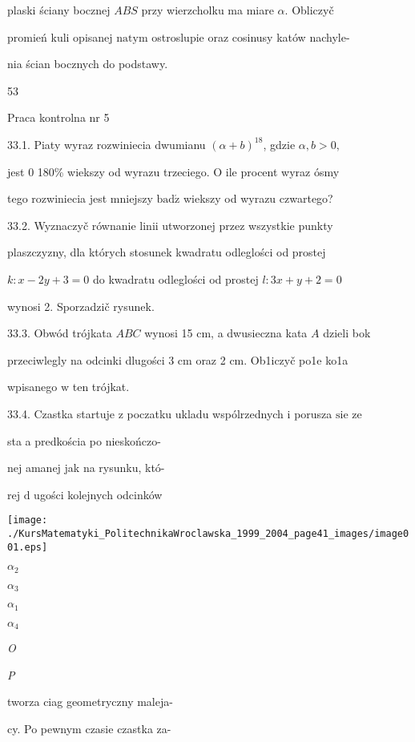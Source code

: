 \documentclass[a4paper,12pt]{article}
\begin{document}
plaski ściany bocznej $ABS$ przy wierzcholku ma miare $\alpha$. Obliczyč

promień kuli opisanej $\mathrm{n}\mathrm{a}\mathrm{t}\mathrm{y}\mathrm{m}$ ostroslupie oraz cosinusy katów nachyle-

nia ścian bocznych do podstawy.





53

Praca kontrolna nr 5

33.1. Piaty wyraz rozwiniecia dwumianu $(\alpha+b)^{18}$, gdzie $\alpha, b > 0,$

jest $0$ 180\% wiekszy od wyrazu trzeciego. $\mathrm{O}$ ile procent wyraz ósmy

tego rozwiniecia jest mniejszy $\mathrm{b}\mathrm{a}\mathrm{d}\acute{\mathrm{z}}$ wiekszy od wyrazu czwartego?

33.2. Wyznaczyč równanie linii utworzonej przez wszystkie punkty

plaszczyzny, dla których stosunek kwadratu odleglości od prostej

$k:x-2y+3=0$ do kwadratu odleglości od prostej $l:3x+y+2=0$

wynosi 2. Sporzadzič rysunek.

33.3. Obwód trójkata $ABC$ wynosi 15 cm, a dwusieczna kata $A$ dzieli bok

przeciwlegly na odcinki dlugości 3 cm oraz 2 cm. Ob1iczyč po1e ko1a

wpisanego $\mathrm{w}$ ten trójkat.

33.4. Czastka startuje $\mathrm{z}$ poczatku ukladu wspólrzednych $\mathrm{i}$ porusza $\mathrm{s}\mathrm{i}\mathrm{e}$ ze

sta a predkościa po nieskończo-

nej amanej jak na rysunku, któ- 

rej $\mathrm{d}$ ugości kolejnych odcinków
\begin{center}
\texttt{[image: ./KursMatematyki\_PolitechnikaWroclawska\_1999\_2004\_page41\_images/image001.eps]}
\end{center}
$\alpha_{2}$

$\alpha_{3}$

$\alpha_{1}$

$\alpha_{4}$

{\it O}

{\it P}

tworza ciag geometryczny maleja-

cy. Po pewnym czasie czastka za-
\end{document}

